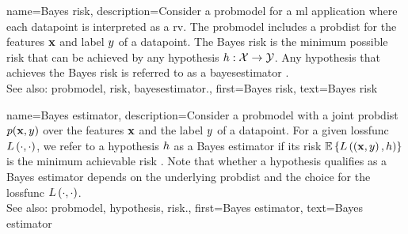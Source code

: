 {name={Bayes risk},
	description={Consider a \gls{probmodel} for a \gls{ml} application where each 
	\gls{datapoint} is interpreted as a \gls{rv}. The \gls{probmodel} includes 
	a \gls{probdist} for the \glspl{feature} ${\bf x}$ and \gls{label} $y$ 
	of a \gls{datapoint}. The Bayes \gls{risk} is the \gls{minimum} 
	possible \gls{risk} that can be achieved by any \gls{hypothesis} $h: \mathcal{X} \rightarrow \mathcal{Y}$. 
		Any \gls{hypothesis} that achieves the Bayes \gls{risk} is referred to as a 
		\gls{bayesestimator} \cite{LC}.
		\\
		See also: \gls{probmodel}, \gls{risk}, \gls{bayesestimator}.},
	first={Bayes risk},
	text={Bayes risk}
}
	
{name={Bayes estimator},
	description={Consider a \gls{probmodel} with a joint \gls{probdist} 
		$p({\bf x},y)$ over the \glspl{feature} ${\bf x}$ and the \gls{label} $y$ 
		of a \gls{datapoint}. For a given \gls{lossfunc} $L\left(\cdot,\cdot \right)$, we refer to a \gls{hypothesis} 
		$h$ as a Bayes estimator if its \gls{risk} 
		$\mathbb{E}\left\{L\left(\left( {\bf x},y \right),h \right)\right\}$
		is the \gls{minimum} achievable \gls{risk} \cite{LC}. 
		Note that whether a \gls{hypothesis} qualifies as a Bayes estimator depends on 
		the underlying \gls{probdist} and the choice for the \gls{lossfunc} $L\left(\cdot,\cdot \right)$.
		\\
		See also: \gls{probmodel}, \gls{hypothesis}, \gls{risk}.},
	first={Bayes estimator},
	text={Bayes estimator}
}


